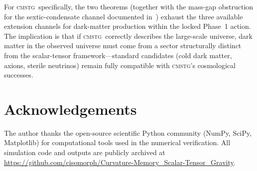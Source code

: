 \documentclass[12pt,a4paper]{article}
\theoremstyle{plain}
\newcommand{\CMSTG}{\textsc{cmstg}}
\begin{document}
For \CMSTG\ specifically, the two theorems (together with the mass-gap
obstruction for the sextic-condensate channel documented
in~\cite{WilsonPaperIV}) exhaust the three available extension channels
for dark-matter production within the locked Phase~1 action.  The
implication is that if \CMSTG\ correctly describes the large-scale
universe, dark matter in the observed universe must come from a sector
structurally distinct from the scalar-tensor framework---standard
candidates (cold dark matter, axions, sterile neutrinos) remain fully
compatible with \CMSTG's cosmological successes.

\section*{Acknowledgements}

The author thanks the open-source scientific Python community (NumPy,
SciPy, Matplotlib) for computational tools used in the numerical
verification.  All simulation code and outputs are publicly archived at
\url{https://github.com/cisomorph/Curvature-Memory_Scalar-Tensor_Gravity}.



\end{document}
